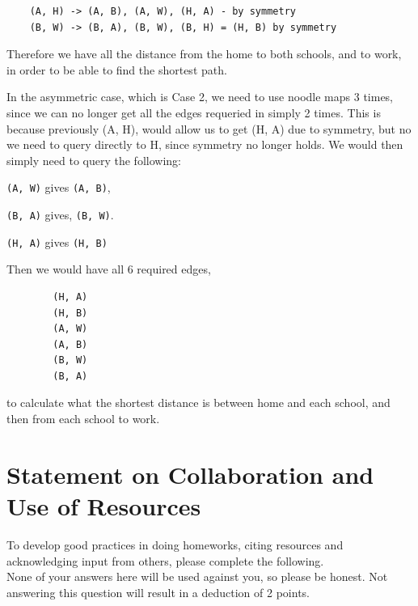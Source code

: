 \documentclass[letterpaper,11pt]{article}
\theoremstyle{plain}
\theoremstyle{definition}
\begin{document}
{\begin{enumerate}[a)]
    \begin{verbatim}
    (A, H) -> (A, B), (A, W), (H, A) - by symmetry
    (B, W) -> (B, A), (B, W), (B, H) = (H, B) by symmetry
    \end{verbatim}

    Therefore we have all the distance from the home to both schools, and to work, in order to be able to find the shortest path.
    
    In the asymmetric case, which is Case 2, we need to use noodle maps 3 times, since we can no longer get all the edges requeried in simply 2 times. This is because previously (A, H), would allow us to get (H, A) due to symmetry, but no we need to query directly to H, since symmetry no longer holds. We would then simply need to query the following:
    
    \texttt{(A, W)} gives \texttt{(A, B)}, 
    
    \texttt{(B, A)} gives, \texttt{(B, W)}. 
    
    \texttt{(H, A)} gives \texttt{(H, B)}

    Then we would have all 6 required edges,

    \begin{verbatim}
        (H, A)
        (H, B)
        (A, W)
        (A, B)
        (B, W)
        (B, A)
    \end{verbatim}

    to calculate what the shortest distance is between home and each school, and then from each school to work.
    
    \color{black}
    \end{enumerate}
    }
\newpage


	\newpage
	    
	\section*{Statement on Collaboration and Use of Resources}
	
	To develop good practices in doing homeworks, citing resources and acknowledging input from others, please complete the following.\\

    None of your answers here will be used against you, so please be honest. Not answering this question will result in a deduction of 2 points.
	
\end{document}
